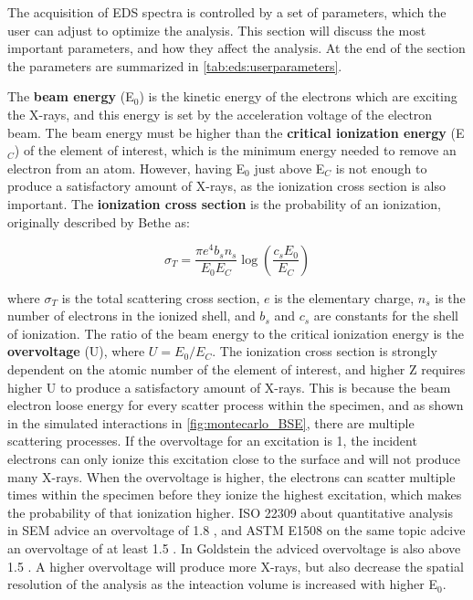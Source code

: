 The acquisition of EDS spectra is controlled by a set of parameters, which the user can adjust to optimize the analysis.
This section will discuss the most important parameters, and how they affect the analysis.
At the end of the section the parameters are summarized in \cref{tab:eds:userparameters}.

The \textbf{beam energy} (E$_0$) is the kinetic energy of the electrons which are exciting the X-rays, and this energy is set by the acceleration voltage of the electron beam.
The beam energy must be higher than the \textbf{critical ionization energy} (E$_C$) of the element of interest, which is the minimum energy needed to remove an electron from an atom.
However, having E$_0$ just above E$_C$ is not enough to produce a satisfactory amount of X-rays, as the ionization cross section is also important.
The \textbf{ionization cross section} is the probability of an ionization, originally described by Bethe \cite{inokuti_on_bethe_1971} as:

\begin{equation}
    \sigma_T = \frac{\pi e^4 b_s n_s}{E_0 E_C}  \log\left(\frac{c_s E_0}{E_C}\right)
\end{equation}

where $\sigma_T$ is the total scattering cross section, $e$ is the elementary charge, $n_s$ is the number of electrons in the ionized shell, and $b_s$ and $c_s$ are constants for the shell of ionization.
The ratio of the beam energy to the critical ionization energy is the \textbf{overvoltage} (U), where $ U = E_0/E_C$.
The ionization cross section is strongly dependent on the atomic number of the element of interest, and higher Z requires higher U to produce a satisfactory amount of X-rays.
This is because the beam electron loose energy for every scatter process within the specimen, and as shown in the simulated interactions in \cref{fig:montecarlo_BSE}, there are multiple scattering processes.
If the overvoltage for an excitation is 1, the incident electrons can only ionize this excitation close to the surface and will not produce many X-rays.
When the overvoltage is higher, the electrons can scatter multiple times within the specimen before they ionize the highest excitation, which makes the probability of that ionization higher.
ISO 22309 about quantitative analysis in SEM advice an overvoltage of 1.8 \cite{iso_emsa_22029}, and ASTM E1508 on the same topic adcive an overvoltage of at least 1.5 \cite{astm_e1508_eds_quantification}.
In Goldstein the adviced overvoltage is also above 1.5 \cite[Ch. 20.2.2]{goldstein_scanning_2018}.
A higher overvoltage will produce more X-rays, but also decrease the spatial resolution of the analysis as the inteaction volume is increased with higher E$_0$.


